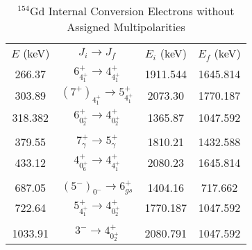 \begin{landscape}
\begin{table}
    \centering
    \caption{$^{154}$Gd Internal Conversion Electrons without Assigned Multipolarities}
    \label{tab:154Gd_No_Mult_ICC}
\begin{ThreePartTable}
        \centering
    \begin{tabular}{>{\footnotesize}c|>{\footnotesize}c|>{\footnotesize}c|>{\footnotesize}c}
        \multicolumn{4}{>{\fontsize{12}{15}}c}{(a)}\\
        \toprule
        $E$ (keV) & $J_i\rightarrow J_f$	& $E_i$ (keV) 	& $E_f$ (keV) \\
	    \hline
	    266.37	&	$6^+_{4^+_1}	\rightarrow	4^+_{4^+_1}$	&	1911.544	&	1645.814 \\ \hline
	    303.89	&	$(7^+)_{4^+_1}	\rightarrow	5^+_{4^+_1}$	&	2073.30	&	1770.187 \\ \hline
	    318.382	&	$6^+_{0^+_2}	\rightarrow	4^+_{0^+_2}$	&	1365.87	&	1047.592	\\
	    &		&		&		\\  \hline
	    379.55	&	$7^+_{\gamma}	\rightarrow	5^+_{\gamma}$	&	1810.21	&	1432.588 \\ \hline
        433.12	&	$4^+_{0^+_6}	\rightarrow	4^+_{4^+_1}$	&	2080.23	&	1645.814	\\ 
        	&	&	&	\\ \hline
        687.05	&	$(5^-)_{0^-} \rightarrow 6^+_{gs}$		&	1404.16	&	717.662 \\ \hline
        722.64	&	$5^+_{4^+_1}	\rightarrow	4^+_{0^+_2}$	&	1770.187	&	1047.592 \\
        &	&	&	\\ \hline
        1033.91	&	$3^-	\rightarrow	4^+_{0^+_2}$	&	2080.791	&	1047.592 \\
        \bottomrule
    \end{tabular}
\end{ThreePartTable}
\end{table}


\end{landscape}
